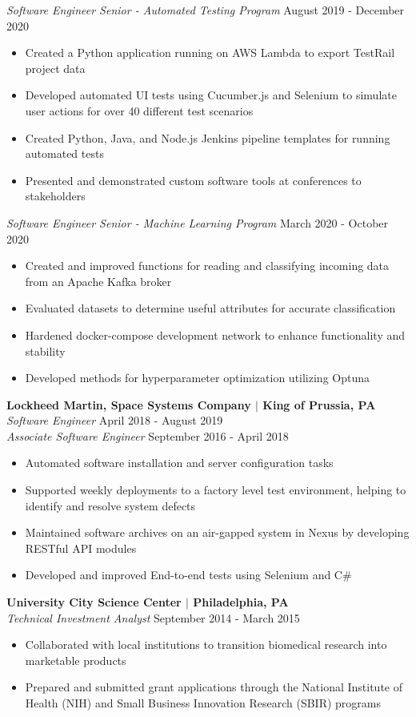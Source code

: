\documentclass[line,resmargin,11pt]{res}
\begin{document}
\begin{resume}
{\sl Software Engineer Senior - Automated Testing Program} \hfill August 2019 - December 2020
	\begin{itemize} \itemsep -2pt
		\item Created a Python application running on AWS Lambda to export TestRail project data
		\item Developed automated UI tests using Cucumber.js and Selenium to simulate user actions for over 40 different test scenarios
		\item Created Python, Java, and Node.js Jenkins pipeline templates for running automated tests
		\item Presented and demonstrated custom software tools at conferences to stakeholders
	\end{itemize}
	
{\sl Software Engineer Senior - Machine Learning Program} \hfill March 2020 - October 2020
	\begin{itemize} \itemsep -2pt
		\item Created and improved functions for reading and classifying incoming data from an Apache Kafka broker
		\item Evaluated datasets to determine useful attributes for accurate classification
		\item Hardened docker-compose development network to enhance functionality and stability
		\item Developed methods for hyperparameter optimization utilizing Optuna
	\end{itemize}

\textbf{Lockheed Martin, Space Systems Company $|$ King of Prussia, PA} \\
{\sl Software Engineer} \hfill April 2018 - August 2019 \\
{\sl Associate Software Engineer} \hfill September 2016 - April 2018
	\begin{itemize}  \itemsep -2pt
		\item Automated software installation and server configuration tasks
		\item Supported weekly deployments to a factory level test environment, helping to identify and resolve system defects
		\item Maintained software archives on an air-gapped system in Nexus by developing RESTful API modules
		\item Developed and improved End-to-end tests using Selenium and C\#
	\end{itemize}
				
\textbf{University City Science Center $|$ Philadelphia, PA} \\
{\sl Technical Investment Analyst} \hfill September 2014 - March 2015 
	\begin{itemize} \itemsep -2pt
		\item Collaborated with local institutions to transition biomedical research into marketable products
		\item Prepared and submitted grant applications through the National Institute of Health (NIH) and Small Business Innovation Research (SBIR) programs
	\end{itemize}
				

\end{resume}
\end{document}
